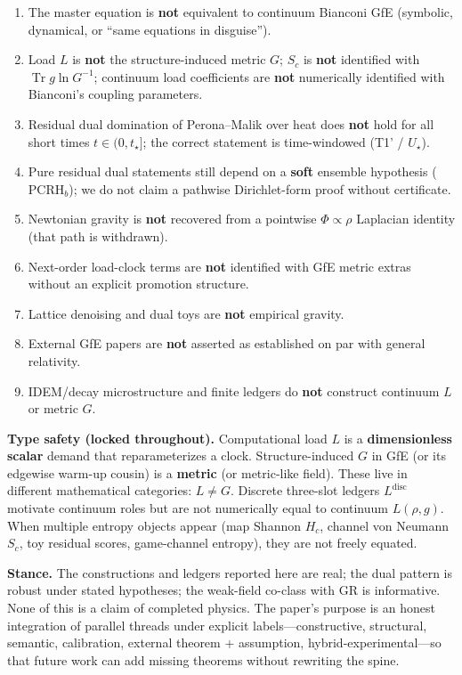 \documentclass[
  11pt,
]{article}
\providecommand{\tightlist}{%
  \setlength{\itemsep}{0pt}\setlength{\parskip}{0pt}}
\begin{document}
\begin{enumerate}
\def\labelenumi{\arabic{enumi}.}
\tightlist
\item
  The master equation is \textbf{not} equivalent to continuum Bianconi
  GfE (symbolic, dynamical, or ``same equations in disguise'').
\item
  Load \(L\) is \textbf{not} the structure-induced metric \(G\); \(S_c\)
  is \textbf{not} identified with \(\operatorname{Tr} g\ln G^{-1}\);
  continuum load coefficients are \textbf{not} numerically identified
  with Bianconi's coupling parameters.
\item
  Residual dual domination of Perona--Malik over heat does \textbf{not}
  hold for all short times \(t\in(0,t_\star]\); the correct statement is
  time-windowed (T1' / \(U_\star\)).
\item
  Pure residual dual statements still depend on a \textbf{soft} ensemble
  hypothesis (\(\mathrm{PCRH}_b\)); we do not claim a pathwise
  Dirichlet-form proof without certificate.
\item
  Newtonian gravity is \textbf{not} recovered from a pointwise
  \(\Phi\propto\rho\) Laplacian identity (that path is withdrawn).
\item
  Next-order load-clock terms are \textbf{not} identified with GfE
  metric extras without an explicit promotion structure.
\item
  Lattice denoising and dual toys are \textbf{not} empirical gravity.
\item
  External GfE papers are \textbf{not} asserted as established on par
  with general relativity.
\item
  IDEM/decay microstructure and finite ledgers do \textbf{not} construct
  continuum \(L\) or metric \(G\).
\end{enumerate}

\textbf{Type safety (locked throughout).} Computational load \(L\) is a
\textbf{dimensionless scalar} demand that reparameterizes a clock.
Structure-induced \(G\) in GfE (or its edgewise warm-up cousin) is a
\textbf{metric} (or metric-like field). These live in different
mathematical categories: \textbf{\(L\neq G\)}. Discrete three-slot
ledgers \(L^{\mathrm{disc}}\) motivate continuum roles but are not
numerically equal to continuum \(L(\rho,g)\). When multiple entropy
objects appear (map Shannon \(H_c\), channel von Neumann \(S_c\), toy
residual scores, game-channel entropy), they are not freely equated.

\textbf{Stance.} The constructions and ledgers reported here are real;
the dual pattern is robust under stated hypotheses; the weak-field
co-class with GR is informative. None of this is a claim of completed
physics. The paper's purpose is an honest integration of parallel
threads under explicit labels---constructive, structural, semantic,
calibration, external theorem + assumption, hybrid-experimental---so
that future work can add missing theorems without rewriting the spine.
\end{document}
